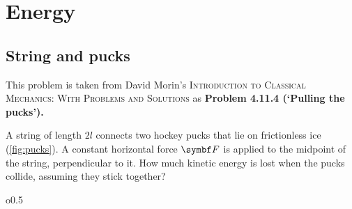 \chapter{Energy}

\section{String and pucks}

This problem is taken from David Morin's {\scshape Introduction to
Classical Mechanics: With Problems and Solutions}
as \bf{Problem 4.11.4} (`Pulling the pucks').

\begin{problem}
  A string of length \(2l\) connects two hockey pucks that lie on
  frictionless ice (\cref{fig:pucks}). A constant horizontal force
  \(\mv{F}\) is applied
  to the midpoint of the string, perpendicular to it. How much
  kinetic energy is lost when the pucks collide, assuming they stick together?
\end{problem}

\begin{wrapfigure}{o}{0.5\textwidth}
  \centering
  \caption{String and two pucks}
  \label{fig:pucks}
\end{wrapfigure}

